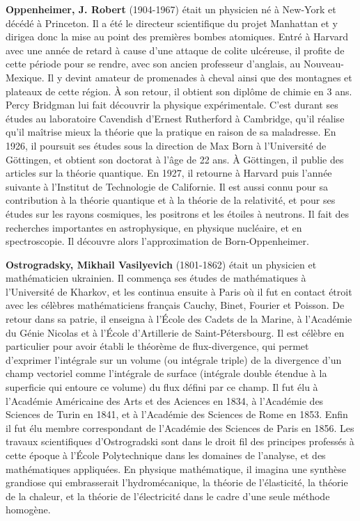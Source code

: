 \textbf{Oppenheimer, J. Robert} (1904-1967) était un physicien né à New-York et décédé à Princeton. Il a été le directeur scientifique du projet Manhattan et y dirigea donc la mise au point des premières bombes atomiques. Entré à Harvard avec une année de retard à cause d'une attaque de colite ulcéreuse, il profite de cette période pour se rendre, avec son ancien professeur d'anglais, au Nouveau-Mexique. Il y devint amateur de promenades à cheval ainsi que des montagnes et plateaux de cette région. À son retour, il obtient son diplôme de chimie en 3 ans. Percy Bridgman lui fait découvrir la physique expérimentale. C'est durant ses études au laboratoire Cavendish d'Ernest Rutherford à Cambridge, qu'il réalise qu'il maîtrise mieux la théorie que la pratique en raison de sa maladresse. En 1926, il poursuit ses études sous la direction de Max Born à l'Université de Göttingen, et obtient son doctorat à l'âge de 22 ans. À Göttingen, il publie des articles sur la théorie quantique. En 1927, il retourne à Harvard puis l'année suivante à l'Institut de Technologie de Californie. Il est aussi connu pour sa contribution à la théorie quantique et à la théorie de la relativité, et pour ses études sur les rayons cosmiques, les positrons et les étoiles à neutrons. Il fait des recherches importantes en astrophysique, en physique nucléaire, et en spectroscopie. Il découvre alors l'approximation de Born-Oppenheimer.

\textbf{Ostrogradsky, Mikhail Vasilyevich} (1801-1862) était un physicien et mathématicien ukrainien. Il commença ses études de mathématiques à l'Université de Kharkov, et les continua ensuite à Paris où il fut en contact étroit avec les célèbres mathématiciens français Cauchy, Binet, Fourier et Poisson. De retour dans sa patrie, il enseigna à l'École des Cadets de la Marine, à l'Académie du Génie Nicolas et à l'École d'Artillerie de Saint-Pétersbourg. Il est célèbre en particulier pour avoir établi le théorème de flux-divergence, qui permet d'exprimer l'intégrale sur un volume (ou intégrale triple) de la divergence d'un champ vectoriel comme l'intégrale de surface (intégrale double étendue à la superficie qui entoure ce volume) du flux défini par ce champ. Il fut élu à l'Académie Américaine des Arts et des Aciences en 1834, à l'Académie des Sciences de Turin en 1841, et à l'Académie des Sciences de Rome en 1853. Enfin il fut élu membre correspondant de l'Académie des Sciences de Paris en 1856. Les travaux scientifiques d'Ostrogradski sont dans le droit fil des principes professés à cette époque à l'École Polytechnique dans les domaines de l'analyse, et des mathématiques appliquées. En physique mathématique, il imagina une synthèse grandiose qui embrasserait l'hydromécanique, la théorie de l'élasticité, la théorie de la chaleur, et la théorie de l'électricité dans le cadre d'une seule méthode homogène.

